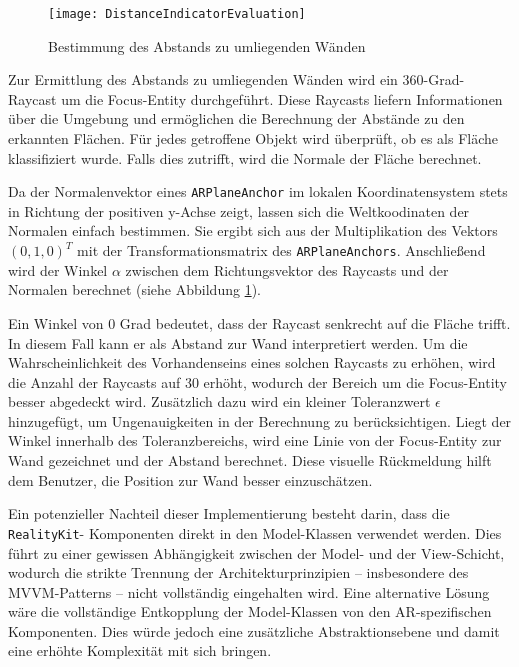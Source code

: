\begin{figure}[ht]
    \centering
    \texttt{[image: DistanceIndicatorEvaluation]}
    \caption{Bestimmung des Abstands zu umliegenden Wänden}
    \label{fig:DistanceIndicatorEvaluation}
\end{figure}

Zur Ermittlung des Abstands zu umliegenden Wänden wird ein 360-Grad-Raycast um die Focus-Entity durchgeführt. Diese Raycasts liefern Informationen über die Umgebung und ermöglichen die Berechnung der Abstände zu den erkannten Flächen. Für jedes getroffene Objekt wird überprüft, ob es als Fläche klassifiziert wurde. Falls dies zutrifft, wird die Normale der Fläche berechnet.

Da der Normalenvektor eines \texttt{ARPlaneAnchor} im lokalen Koordinatensystem stets in Richtung der positiven y-Achse zeigt, lassen sich die Weltkoodinaten der Normalen einfach bestimmen. Sie ergibt sich aus der Multiplikation des Vektors \( (0,1,0)^T \) mit der Transformationsmatrix des \texttt{ARPlaneAnchors}. Anschließend wird der Winkel \( \alpha \) zwischen dem Richtungsvektor des Raycasts und der Normalen berechnet (siehe Abbildung \ref{fig:DistanceIndicatorEvaluation}). 

Ein Winkel von 0 Grad bedeutet, dass der Raycast senkrecht auf die Fläche trifft. In diesem Fall kann er als Abstand zur Wand interpretiert werden. Um die Wahrscheinlichkeit des Vorhandenseins eines solchen Raycasts zu erhöhen, wird die Anzahl der Raycasts auf 30 erhöht, wodurch der Bereich um die Focus-Entity besser abgedeckt wird. Zusätzlich dazu wird ein kleiner Toleranzwert \( \epsilon \) hinzugefügt, um Ungenauigkeiten in der Berechnung zu berücksichtigen. Liegt der Winkel innerhalb des Toleranzbereichs, wird eine Linie von der Focus-Entity zur Wand gezeichnet und der Abstand berechnet. Diese visuelle Rückmeldung hilft dem Benutzer, die Position zur Wand besser einzuschätzen.

Ein potenzieller Nachteil dieser Implementierung besteht darin, dass die \texttt{RealityKit}- \linebreak Komponenten direkt in den Model-Klassen verwendet werden. Dies führt zu einer gewissen Abhängigkeit zwischen der Model- und der View-Schicht, wodurch die strikte Trennung der Architekturprinzipien – insbesondere des MVVM-Patterns – nicht vollständig eingehalten wird. Eine alternative Lösung wäre die vollständige Entkopplung der Model-Klassen von den AR-spezifischen Komponenten. Dies würde jedoch eine zusätzliche Abstraktionsebene und damit eine erhöhte Komplexität mit sich bringen.

